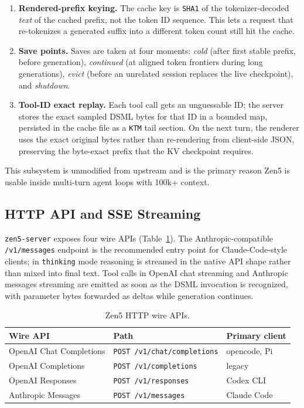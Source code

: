 \documentclass[11pt,a4paper]{article}
\begin{document}
\begin{enumerate}
  \item \textbf{Rendered-prefix keying.} The cache key is \texttt{SHA1} of the tokenizer-decoded
        \emph{text} of the cached prefix, not the token ID sequence. This lets a request that
        re-tokenizes a generated suffix into a different token count still hit the cache.
  \item \textbf{Save points.} Saves are taken at four moments: \emph{cold} (after first stable
        prefix, before generation), \emph{continued} (at aligned token frontiers during long
        generations), \emph{evict} (before an unrelated session replaces the live checkpoint), and
        \emph{shutdown}.
  \item \textbf{Tool-ID exact replay.} Each tool call gets an unguessable ID; the server stores the
        exact sampled DSML bytes for that ID in a bounded map, persisted in the cache file as a
        \texttt{KTM} tail section. On the next turn, the renderer uses the exact original bytes
        rather than re-rendering from client-side JSON, preserving the byte-exact prefix that the KV
        checkpoint requires.
\end{enumerate}

This subsystem is unmodified from upstream and is the primary reason Zen5 is usable inside multi-turn
agent loops with 100k+ context.

\subsection{HTTP API and SSE Streaming}

\texttt{zen5-server} exposes four wire APIs (Table~\ref{tab:endpoints}). The Anthropic-compatible
\texttt{/v1/messages} endpoint is the recommended entry point for Claude-Code-style clients; in
\texttt{thinking} mode reasoning is streamed in the native API shape rather than mixed into final
text. Tool calls in OpenAI chat streaming and Anthropic messages streaming are emitted as soon as the
DSML invocation is recognized, with parameter bytes forwarded as deltas while generation continues.

\begin{table}[H]
\centering
\begin{tabular}{lll}
\toprule
Wire API & Path & Primary client \\
\midrule
OpenAI Chat Completions & \texttt{POST /v1/chat/completions} & opencode, Pi \\
OpenAI Completions & \texttt{POST /v1/completions} & legacy \\
OpenAI Responses & \texttt{POST /v1/responses} & Codex CLI \\
Anthropic Messages & \texttt{POST /v1/messages} & Claude Code \\
\bottomrule
\end{tabular}
\caption{Zen5 HTTP wire APIs.}
\label{tab:endpoints}
\end{table}
\end{document}
